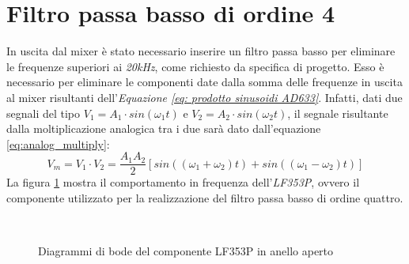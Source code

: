 \documentclass[titlepage]{report}
\begin{document}
\section{Filtro passa basso di ordine 4}
	In uscita dal mixer è stato necessario inserire un filtro passa basso per eliminare le frequenze superiori ai \textit{20kHz}, come richiesto da specifica di progetto. Esso è necessario per eliminare le componenti date dalla somma delle frequenze in uscita al mixer risultanti dell'\textit{Equazione \ref{eq: prodotto sinusoidi AD633}}. Infatti, dati due segnali del tipo $ V_1 = A_1 \cdot sin(\omega_1t) $
	e $ V_2 = A_2 \cdot sin(\omega_2t) $, il segnale risultante dalla moltiplicazione analogica tra i due sarà dato dall'equazione \ref{eq:analog_multiply}:
	\begin{equation}
		V_m = V_1 \cdot V_2 = \frac{A_1A_2}{2}[sin((\omega_1 + \omega_2)t) + sin((\omega_1 - \omega_2)t)]
		\label{eq:analog_multiply}
	\end{equation}
	La figura \ref{fig:bode_LF353P} mostra il comportamento in frequenza dell'\textit{LF353P}, ovvero il componente utilizzato per la realizzazione del filtro passa basso di ordine quattro.

	\begin{figure}[h]
		\centering
		 \qquad
		 \\
		\caption{Diagrammi di bode del componente LF353P in anello aperto}
		\label{fig:bode_LF353P}
	\end{figure}
\end{document}
